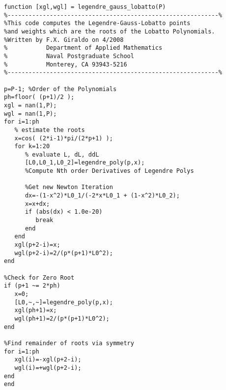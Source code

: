\begin{lstlisting}[style=myMatlab,name=lec34n-ex2]
function [xgl,wgl] = legendre_gauss_lobatto(P)
%------------------------------------------------------------%
%This code computes the Legendre-Gauss-Lobatto points 
%and weights which are the roots of the Lobatto Polynomials.
%Written by F.X. Giraldo on 4/2008
%           Department of Applied Mathematics
%           Naval Postgraduate School 
%           Monterey, CA 93943-5216
%------------------------------------------------------------%

p=P-1; %Order of the Polynomials
ph=floor( (p+1)/2 );
xgl = nan(1,P);
wgl = nan(1,P);
for i=1:ph
   % estimate the roots
   x=cos( (2*i-1)*pi/(2*p+1) );
   for k=1:20
      % evaluate L, dL, ddL
      [L0,L0_1,L0_2]=legendre_poly(p,x); 
      %Compute Nth order Derivatives of Legendre Polys
      
      %Get new Newton Iteration
      dx=-(1-x^2)*L0_1/(-2*x*L0_1 + (1-x^2)*L0_2);
      x=x+dx;
      if (abs(dx) < 1.0e-20) 
         break
      end
   end
   xgl(p+2-i)=x;
   wgl(p+2-i)=2/(p*(p+1)*L0^2);
end

%Check for Zero Root
if (p+1 ~= 2*ph)
   x=0;
   [L0,~,~]=legendre_poly(p,x);
   xgl(ph+1)=x;
   wgl(ph+1)=2/(p*(p+1)*L0^2);
end
   
%Find remainder of roots via symmetry
for i=1:ph
   xgl(i)=-xgl(p+2-i);
   wgl(i)=+wgl(p+2-i);
end   
end
\end{lstlisting}
